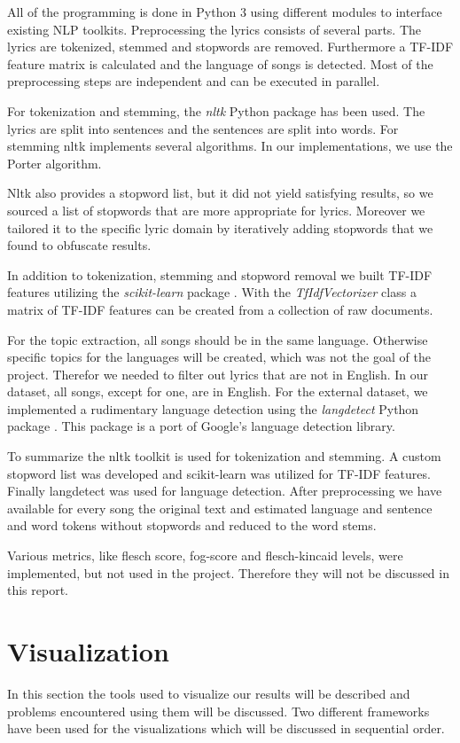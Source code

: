 \documentclass[10pt,a4paper]{article}
\begin{document}
	All of the programming is done in Python 3 using different modules to interface existing NLP toolkits. Preprocessing the lyrics consists of several parts. The lyrics are tokenized, stemmed and stopwords are removed. Furthermore a TF-IDF feature matrix is calculated and the language of songs is detected. Most of the preprocessing steps are independent and can be executed in parallel. 
	
	For tokenization and stemming, the \textit{nltk} Python package \cite{nltk} has been used. The lyrics are split into sentences and the sentences are split into words. For stemming nltk implements several algorithms. In our implementations, we use the Porter algorithm.  
	
	Nltk also provides a stopword list, but it did not yield satisfying results, so we sourced a list of stopwords that are more appropriate for lyrics. Moreover we tailored it to the specific lyric domain by iteratively adding stopwords that we found to obfuscate results.
	
	In addition to tokenization, stemming and stopword removal we built TF-IDF features utilizing the \textit{scikit-learn} package \cite{scikit-learn}. With the \textit{TfIdfVectorizer} class a matrix of TF-IDF features can be created from a collection of raw documents. 
	
	For the topic extraction, all songs should be in the same language. Otherwise specific topics for the languages will be created, which was not the goal of the project. Therefor we needed to filter out lyrics that are not in English.  
	In our dataset, all songs, except for one, are in English. For the external dataset, we implemented a rudimentary language detection using the \textit{langdetect} Python package \cite{langdetect}. This package is a port of Google's language detection library.
	
	To summarize the nltk toolkit is used for tokenization and stemming. A custom stopword list was developed and scikit-learn was utilized for TF-IDF features. Finally langdetect was used for language detection. After preprocessing we have available for every song the original text and estimated language and sentence and word tokens without stopwords and reduced to the word stems.
	
	Various metrics, like flesch score, fog-score and flesch-kincaid levels, were implemented, but not used in the project. Therefore they will not be discussed in this report.
	
	\section{Visualization}
	\label{sec:visualization}
	In this section the tools used to visualize our results will be described and problems encountered using them will be discussed. Two different frameworks have been used for the visualizations which will be discussed in sequential order.
	
\end{document}
